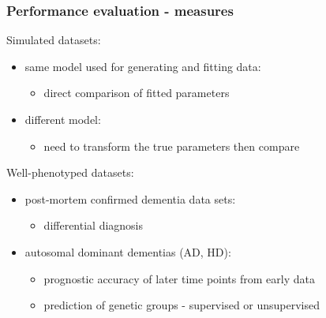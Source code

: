 \documentclass[10pt,xcolor=table]{beamer}
\begin{document}
\begin{frame}
\frametitle{Performance evaluation - measures}


% 
Simulated datasets:
\begin{itemize}
 \item same model used for generating and fitting data:
    \begin{itemize}
    \item \textcolor{parCol}{direct comparison of fitted parameters}
    \end{itemize}
 \item different model:
    \begin{itemize}
    \item need to transform the true parameters then compare
    \end{itemize}

\end{itemize}
\vspace{0.5cm}


Well-phenotyped datasets:
\begin{itemize}
  \item post-mortem confirmed dementia data sets: 
  \begin{itemize}
    \item \textcolor{bothCol}{differential diagnosis}
  \end{itemize}
    
  \item autosomal dominant dementias (AD, HD): 
  \begin{itemize}
    \item \textcolor{bothCol}{prognostic accuracy of later time points from early data}
    \item \textcolor{bothCol}{prediction of genetic groups - supervised or unsupervised}
  \end{itemize}
\end{itemize}

\end{frame}
\end{document}
